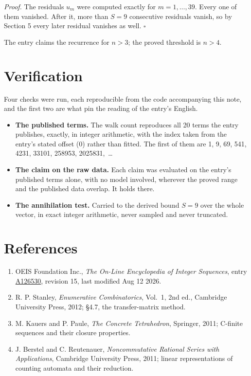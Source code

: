 \documentclass[11pt]{article}
\theoremstyle{definition}
\begin{document}
{\itshape Proof.} The residuals $u_m$ were computed exactly for $m = 1,\dots,39$. Every one of them vanished. After it, more than $S = 9$ consecutive residuals vanish, so by Section 5 every later residual vanishes as well. $\square$

The entry claims the recurrence for $n > 3$; the proved threshold is $n > 4$.

\section{Verification}

Four checks were run, each reproducible from the code accompanying this note, and the first two are what pin the reading of the entry's English.

\begin{itemize}

\item {\bfseries The published terms.} The walk count reproduces all 20 terms the entry publishes, exactly, in integer arithmetic, with the index taken from the entry's stated offset (0) rather than fitted. The first of them are 1, 9, 69, 541, 4231, 33101, 258953, 2025831,~\dots

\item {\bfseries The claim on the raw data.} Each claim was evaluated on the entry's published terms alone, with no model involved, wherever the proved range and the published data overlap. It holds there.

\item {\bfseries The annihilation test.} Carried to the derived bound $S = 9$ over the whole vector, in exact integer arithmetic, never sampled and never truncated.

\end{itemize}

\section{References}

\begin{enumerate}

\item OEIS Foundation Inc., \emph{The On-Line Encyclopedia of Integer Sequences}, entry \href{https://oeis.org/A126530}{A126530}, revision 15, last modified Aug 12 2026.

\item R. P. Stanley, \emph{Enumerative Combinatorics}, Vol.~1, 2nd ed., Cambridge University Press, 2012; \S4.7, the transfer-matrix method.

\item M. Kauers and P. Paule, \emph{The Concrete Tetrahedron}, Springer, 2011; C-finite sequences and their closure properties.

\item J. Berstel and C. Reutenauer, \emph{Noncommutative Rational Series with Applications}, Cambridge University Press, 2011; linear representations of counting automata and their reduction.

\end{enumerate}
\end{document}
